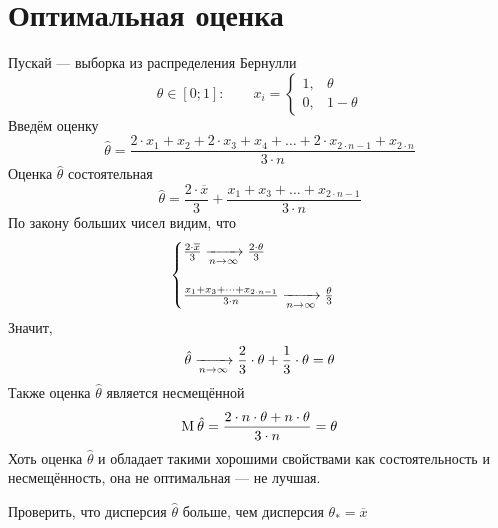 \section{Оптимальная оценка}
\begin{example}\label{example:optimalEstimate}
  Пускай \xsample[2 \cdot n] --- выборка из распределения Бернулли
  \begin{equation*}
    \theta \in \left[ 0; 1 \right]:\qquad
    x_i = \begin{cases}
      1,& \theta \\
      0,& 1 - \theta
    \end{cases}
  \end{equation*}
  Введём оценку
  \begin{equation*}
    \hat{\theta}
    = \frac{2 \cdot x_1 + x_2 + 2 \cdot x_3 + x_4 + \dots
      + 2 \cdot x_{2 \cdot n - 1} + x_{2 \cdot n}}{3 \cdot n}
  \end{equation*}
  Оценка $\hat{\theta}$ состоятельная
  \begin{equation*}
    \hat{\theta}
    = \frac{2 \cdot \overline{x}}{3}
      + \frac{x_1 + x_3 + \dots + x_{2 \cdot n - 1}}{3 \cdot n}
  \end{equation*}
  По закону больших чисел видим, что
  \begin{equation*}
    \begin{cases}
      \frac{2 \cdot \overline{x}}{3} 
        \covergence{} \frac{2 \cdot \theta}{3} \\ \\ %
      \frac{x_1 + x_3 + \dots + x_{2 \cdot n - 1}}{3 \cdot n}
        \covergence{} \frac{\theta}{3}
    \end{cases}
  \end{equation*}
  Значит,
  \begin{equation*}
    \hat{\theta}
    \xrightarrow[n\to\infty]{} \frac{2}{3} \cdot \theta + \frac{1}{3} \cdot \theta
    = \theta
  \end{equation*}
  Также оценка $\hat{\theta}$ является несмещённой
  \begin{equation*}
    \operatorname{M}_{} \hat{\theta}
    = \frac{2 \cdot n \cdot \theta + n \cdot \theta}{3 \cdot n}
    = \theta
  \end{equation*}
  Хоть оценка $\hat{\theta}$ и обладает такими хорошими свойствами как
  состоятельность и несмещённость, она не оптимальная --- не лучшая.
\end{example}

\begin{exercise}
  Проверить, что дисперсия $\hat{\theta}$ больше, чем дисперсия
  $\theta_* = \overline{x}$
\end{exercise}

